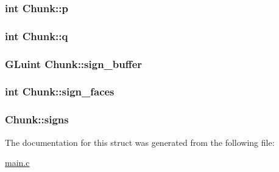 \subsubsection[{\texorpdfstring{p}{p}}]{\setlength{\rightskip}{0pt plus 5cm}int Chunk\+::p}\hypertarget{structChunk_a016383084b50c856a1fb63f97ca63dc6}{}\label{structChunk_a016383084b50c856a1fb63f97ca63dc6}
\subsubsection[{\texorpdfstring{q}{q}}]{\setlength{\rightskip}{0pt plus 5cm}int Chunk\+::q}\hypertarget{structChunk_a20fb30e8ac307726320ef6d3e4cd89a1}{}\label{structChunk_a20fb30e8ac307726320ef6d3e4cd89a1}
\subsubsection[{\texorpdfstring{sign\+\_\+buffer}{sign_buffer}}]{\setlength{\rightskip}{0pt plus 5cm}G\+Luint Chunk\+::sign\+\_\+buffer}\hypertarget{structChunk_a7c89d7fc29dbdd94c50280e92def013c}{}\label{structChunk_a7c89d7fc29dbdd94c50280e92def013c}
\subsubsection[{\texorpdfstring{sign\+\_\+faces}{sign_faces}}]{\setlength{\rightskip}{0pt plus 5cm}int Chunk\+::sign\+\_\+faces}\hypertarget{structChunk_a6ffdf89c012dfaefe531aa0eb93fe69a}{}\label{structChunk_a6ffdf89c012dfaefe531aa0eb93fe69a}
\subsubsection[{\texorpdfstring{signs}{signs}}]{ Chunk\+::signs}\hypertarget{structChunk_acd18dcf6bf17f499e36b5806519d8800}{}\label{structChunk_acd18dcf6bf17f499e36b5806519d8800}


The documentation for this struct was generated from the following file\+:\begin{DoxyCompactItemize}
\item 
\hyperlink{main_8c}{main.\+c}\end{DoxyCompactItemize}
